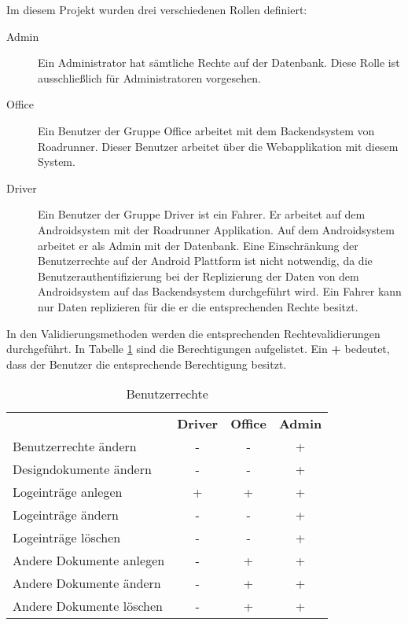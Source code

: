 \noindent Im diesem Projekt wurden drei verschiedenen Rollen definiert:

\begin{description}
	\item[Admin] Ein Administrator hat sämtliche Rechte auf der Datenbank. Diese
		Rolle ist ausschließlich für Administratoren vorgesehen.
	\item[Office] Ein Benutzer der Gruppe Office arbeitet mit dem Backendsystem von
		Roadrunner. Dieser Benutzer arbeitet über die Webapplikation mit diesem System.
	\item[Driver] Ein Benutzer der Gruppe Driver ist ein Fahrer. Er arbeitet auf dem
		Androidsystem mit der Roadrunner Applikation. Auf dem Androidsystem arbeitet
		er als Admin mit der Datenbank. Eine Einschränkung der Benutzerrechte auf der
		Android Plattform ist nicht notwendig, da die Benutzerauthentifizierung bei der
		Replizierung der Daten von dem Androidsystem auf das Backendsystem durchgeführt
		wird. Ein Fahrer kann nur Daten replizieren für die er die entsprechenden Rechte
		besitzt.
\end{description}

\noindent In den Validierungsmethoden werden die entsprechenden Rechtevalidierungen
	durchgeführt. In Tabelle \ref{tab:rechte} sind die Berechtigungen aufgelistet.
	Ein \textbf{+} bedeutet, dass der Benutzer die entsprechende Berechtigung besitzt.

\begin{table}[h]
	\begin{tabular}{lccc}
		& \textbf{Driver} & \textbf{Office} & \textbf{Admin} \\
		Benutzerrechte ändern & - & - & + \\
		Designdokumente ändern & - & - & + \\
		Logeinträge anlegen & + & + & + \\
		Logeinträge ändern & - & - & + \\
		Logeinträge löschen & - & - & + \\
		Andere Dokumente anlegen & - & + & + \\
		Andere Dokumente ändern & - & + & + \\
		Andere Dokumente löschen & - & + & +
	\end{tabular}
	\caption{Benutzerrechte}
	\label{tab:rechte}
\end{table}
